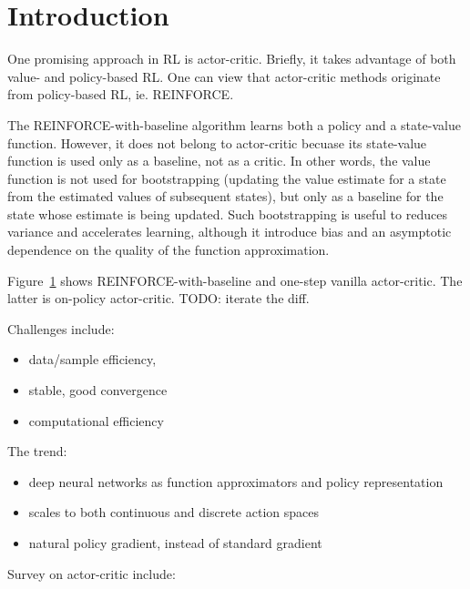 \section{Introduction}

One promising approach in RL is actor-critic.
Briefly, it takes advantage of both value- and policy-based RL.
One can view that actor-critic methods originate from policy-based RL, ie. REINFORCE.

The REINFORCE-with-baseline algorithm learns both a policy and a state-value function.
However, it does not belong to actor-critic becuase
its state-value function is used only as a baseline, not as a critic.
In other words, the value function is not used for bootstrapping
(updating the value estimate for a state from the estimated values of subsequent states),
but only as a baseline for the state whose estimate is being updated.
Such bootstrapping is useful to reduces variance and accelerates learning,
although it introduce bias and an asymptotic dependence on
the quality of the function approximation.

Figure~\ref{} shows REINFORCE-with-baseline and one-step vanilla actor-critic.
The latter is on-policy actor-critic.
TODO: iterate the diff.

Challenges include:
\begin{itemize}
\item data/sample efficiency,
\item stable, good convergence
\item computational efficiency
\end{itemize}

The trend:
\begin{itemize}
\item deep neural networks as
      function approximators and policy representation
\item scales to both continuous and discrete action spaces
\item natural policy gradient, instead of standard gradient
\end{itemize}

Survey on actor-critic include:
\cite{6392457}
